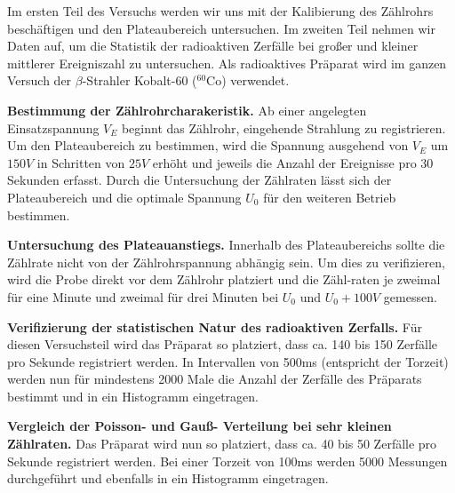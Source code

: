 Im ersten Teil des Versuchs werden wir uns mit der Kalibierung des Zählrohrs beschäftigen und den Plateaubereich untersuchen. Im zweiten Teil nehmen wir Daten auf, um die Statistik der radioaktiven Zerfälle bei großer und kleiner mittlerer Ereigniszahl zu untersuchen. Als radioaktives Präparat wird im ganzen Versuch der $\beta$-Strahler Kobalt-60 ($^60\mathrm{Co}$) verwendet.

\textbf{Bestimmung der Zählrohrcharakeristik.} Ab einer angelegten Einsatzspannung $V_E$ beginnt das Zählrohr, eingehende Strahlung zu registrieren. Um den Plateaubereich zu bestimmen, wird die Spannung ausgehend von $V_E$ um $150\unit{V}$ in Schritten von $25\unit{V}$ erhöht und jeweils die Anzahl der Ereignisse pro 30 Sekunden erfasst. Durch die Untersuchung der Zählraten lässt sich der Plateaubereich und die optimale Spannung $U_0$ für den weiteren Betrieb bestimmen.

\textbf{Untersuchung des Plateauanstiegs.} Innerhalb des Plateaubereichs sollte die Zählrate nicht von der Zählrohrspannung abhängig sein. Um dies zu verifizieren, wird die Probe direkt vor dem Zählrohr platziert und die Zähl-raten je zweimal für eine Minute und zweimal für drei Minuten bei $U_0$ und $U_0 + 100 \si{V}$ gemessen.

\textbf{Verifizierung der statistischen Natur des radioaktiven Zerfalls.} Für diesen Versuchsteil wird das Präparat so platziert, dass ca. 140 bis 150 Zerfälle pro Sekunde registriert werden. In Intervallen von 500ms (entspricht der Torzeit) werden nun für mindestens 2000 Male die Anzahl der Zerfälle des Präparats bestimmt und in ein Histogramm eingetragen.

\textbf{Vergleich der Poisson- und Gauß- Verteilung bei sehr kleinen Zählraten.} Das Präparat wird nun so platziert, dass ca. 40 bis 50 Zerfälle pro Sekunde registriert werden. Bei einer Torzeit von 100ms werden 5000 Messungen durchgeführt und ebenfalls in ein Histogramm eingetragen. 